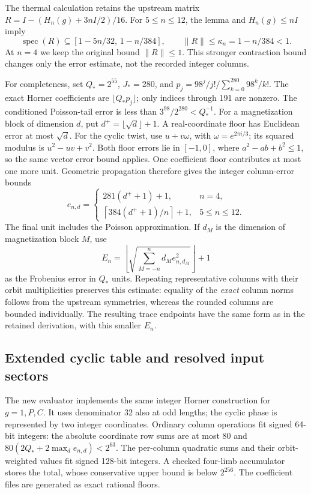 The thermal calculation retains the upstream matrix
$R=I-(H_n(g)+3nI/2)/16$. For $5\le n\le12$, the lemma and
$H_n(g)\le nI$ imply
\[
 \operatorname{spec}(R)\subseteq
 [1-5n/32,\,1-n/384],\qquad
 \|R\|\le\kappa_n=1-n/384<1.
\]
At $n=4$ we keep the original bound $\|R\|\le1$.
This stronger contraction bound changes only the error estimate, not
the recorded integer columns.

For completeness, set $Q_*=2^{55}$, $J_*=280$, and
$p_j=98^j/j!\big/\sum_{k=0}^{280}98^k/k!$.
The exact Horner coefficients are $\lfloor Q_*p_j\rfloor$; only indices
through 191 are nonzero. The conditioned Poisson-tail error is less
than $3^{98}/2^{280}<Q_*^{-1}$.
For a magnetization block of dimension $d$, put
$d^+=\lfloor\sqrt d\rfloor+1$.
A real-coordinate floor has Euclidean error at most $\sqrt d$.
For the cyclic twist, use $u+v\omega$, with
$\omega=e^{2\pi i/3}$; its squared modulus is $u^2-uv+v^2$.
Both floor errors lie in $[-1,0]$, where
$a^2-ab+b^2\le1$, so the same vector error bound applies.
One coefficient floor contributes at most one more unit.
Geometric propagation therefore gives the integer column-error bounds
\[
 e_{n,d}=\begin{cases}
 281(d^++1)+1,&n=4,\\
 \left\lceil384(d^++1)/n\right\rceil+1,&5\le n\le12.
 \end{cases}
\]
The final unit includes the Poisson approximation. If $d_M$ is the
dimension of magnetization block $M$, use
\[
 E_n=\left\lfloor\sqrt{\sum_{M=-n}^{n}d_M e_{n,d_M}^2}\right\rfloor+1
\]
as the Frobenius error in $Q_*$ units. Repeating representative columns
with their orbit multiplicities preserves this estimate: equality of
the \emph{exact} column norms follows from the upstream symmetries,
whereas the rounded columns are bounded individually.
The resulting trace endpoints have the same form as in the retained
derivation, with this smaller $E_n$.

\subsection{Extended cyclic table and resolved input sectors}
The new evaluator  implements the
same integer Horner construction for $g=1,P,C$. It uses denominator
32 also at odd lengths; the cyclic phase is represented by two integer
coordinates. Ordinary column operations fit signed 64-bit integers:
the absolute coordinate row sums are at most 80 and
$80(2Q_*+2\max_d e_{n,d})<2^{63}$.
The per-column quadratic sums and their orbit-weighted values fit
signed 128-bit integers. A checked four-limb accumulator stores the
total, whose conservative upper bound is below $2^{256}$.
The coefficient files are generated as exact rational floors.

